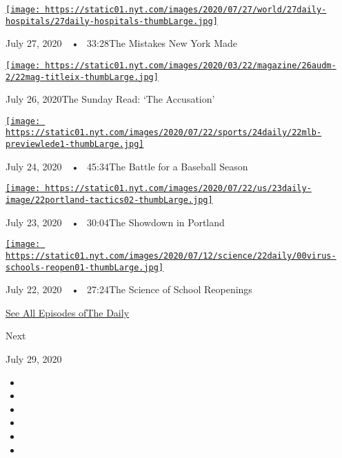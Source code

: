 \href{https://www.nytimes.com/2020/07/27/podcasts/the-daily/new-york-hospitals-covid.html?action=click\&module=audio-series-bar\&region=header\&pgtype=Article}{\texttt{[image: https://static01.nyt.com/images/2020/07/27/world/27daily-hospitals/27daily-hospitals-thumbLarge.jpg]}}

July 27, 2020~~•~ 33:28The Mistakes New York Made

\href{https://www.nytimes.com/2020/07/26/podcasts/the-daily/the-accusation-the-sunday-read.html?action=click\&module=audio-series-bar\&region=header\&pgtype=Article}{\texttt{[image: https://static01.nyt.com/images/2020/03/22/magazine/26audm-2/22mag-titleix-thumbLarge.jpg]}}

July 26, 2020The Sunday Read: `The Accusation'

\href{https://www.nytimes.com/2020/07/24/podcasts/the-daily/mlb-baseball-season-coronavirus.html?action=click\&module=audio-series-bar\&region=header\&pgtype=Article}{\texttt{[image: https://static01.nyt.com/images/2020/07/22/sports/24daily/22mlb-previewlede1-thumbLarge.jpg]}}

July 24, 2020~~•~ 45:34The Battle for a Baseball Season

\href{https://www.nytimes.com/2020/07/23/podcasts/the-daily/portland-protests.html?action=click\&module=audio-series-bar\&region=header\&pgtype=Article}{\texttt{[image: https://static01.nyt.com/images/2020/07/22/us/23daily-image/22portland-tactics02-thumbLarge.jpg]}}

July 23, 2020~~•~ 30:04The Showdown in Portland

\href{https://www.nytimes.com/2020/07/22/podcasts/the-daily/school-reopenings-coronavirus.html?action=click\&module=audio-series-bar\&region=header\&pgtype=Article}{\texttt{[image: https://static01.nyt.com/images/2020/07/12/science/22daily/00virus-schools-reopen01-thumbLarge.jpg]}}

July 22, 2020~~•~ 27:24The Science of School Reopenings

\href{https://www.nytimes.com/column/the-daily}{See All Episodes ofThe
Daily}

Next

July 29, 2020

\begin{itemize}
\item
\item
\item
\item
\item
\item
\end{itemize}


